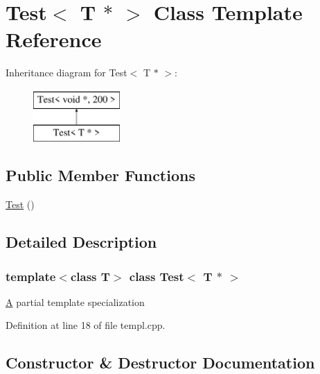 \hypertarget{class_test_3_01_t_01_5_01_4}{}\section{Test$<$ T $\ast$ $>$ Class Template Reference}
\label{class_test_3_01_t_01_5_01_4}
Inheritance diagram for Test$<$ T $\ast$ $>$\+:\begin{figure}[H]
\begin{center}
\leavevmode
\includegraphics[height=2.000000cm]{class_test_3_01_t_01_5_01_4}
\end{center}
\end{figure}
\subsection*{Public Member Functions}
\begin{DoxyCompactItemize}
\item 
\mbox{\hyperlink{class_test_3_01_t_01_5_01_4_a474e8a1211308b3f810f9eafced6cbe7}{Test}} ()
\end{DoxyCompactItemize}


\subsection{Detailed Description}
\subsubsection*{template$<$class T$>$\newline
class Test$<$ T $\ast$ $>$}

\mbox{\hyperlink{class_a}{A}} partial template specialization 

Definition at line 18 of file templ.\+cpp.



\subsection{Constructor \& Destructor Documentation}
\mbox{\label{class_test_3_01_t_01_5_01_4_a474e8a1211308b3f810f9eafced6cbe7}} 

